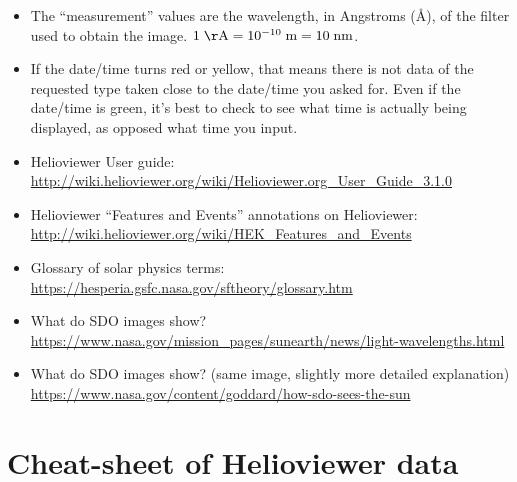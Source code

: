 \documentclass[11pt]{article}%
\newcommand*{\unit}[1]{\;\mathrm{#1}}  %
\begin{document}
\begin{itemize}
    \item The ``measurement'' values are the wavelength, in Angstroms
        (\AA), of the filter used to obtain the image.
        $1 \unit{\AA} = 10^{-10} \unit{m} = 10 \unit{nm}$.
    \item If the date/time turns red or yellow, that means there is not data of
        the requested type taken close to the date/time you asked for.  Even if
        the date/time is green, it's best to check to see what time is actually
        being displayed, as opposed what time you input.
    \item Helioviewer User guide: \\
        \url{http://wiki.helioviewer.org/wiki/Helioviewer.org_User_Guide_3.1.0}
    \item Helioviewer ``Features and Events'' annotations on Helioviewer: \\
        \url{http://wiki.helioviewer.org/wiki/HEK_Features_and_Events}
    \item Glossary of solar physics terms: \\
        \url{https://hesperia.gsfc.nasa.gov/sftheory/glossary.htm}
    \item What do SDO images show? \\
        \url{https://www.nasa.gov/mission_pages/sunearth/news/light-wavelengths.html}
    \item What do SDO images show? (same image, slightly more detailed explanation) \\
        \url{https://www.nasa.gov/content/goddard/how-sdo-sees-the-sun}
\end{itemize}

\section{Cheat-sheet of Helioviewer data}
\end{document}
